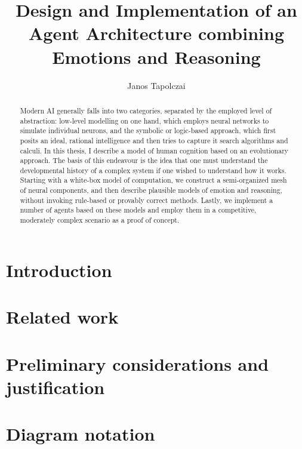 \documentclass[]{scrartcl}
\title{{\huge Design and Implementation of an Agent Architecture combining Emotions and Reasoning}}
\author{Janos Tapolczai}
\begin{document}
\maketitle


\begin{abstract}
Modern AI generally falls into two categories, separated by the employed level of abstraction: low-level modelling on one hand, which employs neural networks to simulate individual neurons, and the symbolic or logic-based approach, which first posits an ideal, rational intelligence and then tries to capture it search algorithms and calculi. In this thesis, I describe a model of human cognition based on an evolutionary approach. The basis of this endeavour is the idea that one must understand the developmental history of a complex system if one wished to understand how it works. Starting with a white-box model of computation, we construct a semi-organized mesh of neural components, and then describe plausible models of emotion and reasoning, without invoking rule-based or provably correct methods. Lastly, we implement a number of agents based on these models and employ them in a competitive, moderately complex scenario as a proof of concept.
\end{abstract}

\newpage

\hypersetup{linkcolor=black}
\tableofcontents
\hypersetup{linkcolor=DeepBlue}
\newpage

\begingroup
\let\clearpage\relax

\section{Introduction}



\section{Related work}

\section{Preliminary considerations and justification}\label{sec:preliminaries}



\section{Diagram notation}
\end{document}
